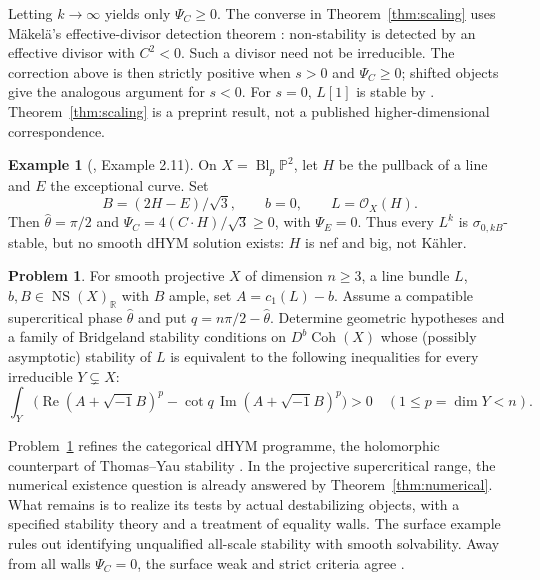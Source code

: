 \documentclass[12pt,reqno]{amsart}
\numberwithin{equation}{section}
\theoremstyle{plain}
\theoremstyle{definition}
\newtheorem{example}[theorem]{Example}
\newtheorem{problem}[theorem]{Problem}
\theoremstyle{remark}
\newcommand{\ii}{\sqrt{-1}}
\newcommand{\R}{\mathbb R}
\newcommand{\NS}{\operatorname{NS}}
\newcommand{\Coh}{\operatorname{Coh}}
\newcommand{\Rea}{\operatorname{Re}}
\newcommand{\Ima}{\operatorname{Im}}
\begin{document}
Letting $k\to\infty$ yields only $\Psi_C\ge0$.
The converse in Theorem~\ref{thm:scaling} uses M\"akel\"a's effective-divisor detection theorem \cite[Theorem 1.1, Corollary 1.5]{Makela}: non-stability is detected by an effective divisor with $C^2<0$. Such a divisor need not be irreducible. The correction above is then strictly positive when $s>0$ and $\Psi_C\ge0$; shifted objects give the analogous argument for $s<0$.
For $s=0$, $L[1]$ is stable by \cite[Corollary 7.2]{Makela}.
Theorem~\ref{thm:scaling} is a preprint result, not a published higher-dimensional correspondence.

\begin{example}[\cite{Fan}, Example 2.11]\label{ex:wall}
On $X=\operatorname{Bl}_p\mathbb P^2$, let $H$ be the pullback of a line and $E$ the exceptional curve. Set
\[
 B=(2H-E)/\sqrt3,\qquad b=0,\qquad L=\mathcal O_X(H).
\]
Then $\widehat\theta=\pi/2$ and
$\Psi_C=4(C\cdot H)/\sqrt3\ge0$, with $\Psi_E=0$.
Thus every $L^k$ is $\sigma_{0,kB}$-stable, but no smooth dHYM solution exists: $H$ is nef and big, not K\"ahler.
\end{example}

\begin{problem}\label{prob:categorical}
For smooth projective $X$ of dimension $n\ge3$, a line bundle $L$,
$b,B\in\NS(X)_\R$ with $B$ ample, set $A=c_1(L)-b$.
Assume a compatible supercritical phase $\widehat\theta$ and put
$q=n\pi/2-\widehat\theta$.
Determine geometric hypotheses and a family of Bridgeland stability conditions on $D^b\Coh(X)$ whose (possibly asymptotic) stability of $L$ is equivalent to the following inequalities for every irreducible $Y\subsetneq X$:
\[
 \int_Y\bigl(\Rea(A+\ii B)^p-\cot q\,\Ima(A+\ii B)^p\bigr)>0
 \quad(1\le p=\dim Y<n).
\]
\end{problem}

Problem~\ref{prob:categorical} refines the categorical dHYM programme, the holomorphic counterpart of Thomas--Yau stability \cite[Conjectures 1.2--1.3]{CS}. In the projective supercritical range, the numerical existence question is already answered by Theorem~\ref{thm:numerical}. What remains is to realize its tests by actual destabilizing objects, with a specified stability theory and a treatment of equality walls. The surface example rules out identifying unqualified all-scale stability with smooth solvability. Away from all walls $\Psi_C=0$, the surface weak and strict criteria agree \cite{Fan,Makela}.
\end{document}
